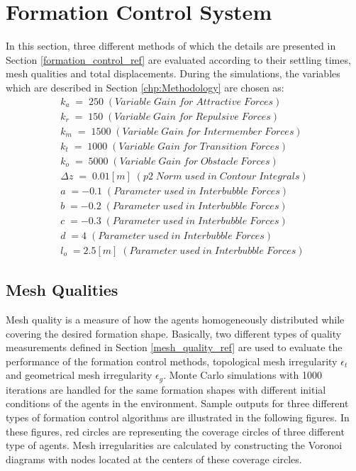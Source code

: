 		
\section{Formation Control System}
In this section, three different methods of which the details are presented in Section \ref{formation_control_ref} are evaluated according to their settling times, mesh qualities and total displacements. During the simulations, the variables which are described in Section \ref{chp:Methodology} are chosen as:
\begin{align*}
  k_a\;=\;250\;(Variable\;Gain\;for\;Attractive\;Forces)\\
  k_r\;=\;150\;(Variable\;Gain\;for\;Repulsive\;Forces)\\
  k_m\;=\;1500\;(Variable\;Gain\;for\;Intermember\;Forces)\\
  k_t\;=\;1000\;(Variable\;Gain\;for\;Transition\;Forces)\\
  k_o\;=\;5000\;(Variable\;Gain\;for\;Obstacle\;Forces)\\
  \Delta z\;=\;0.01[m]\;(p2\;Norm\;used\;in\;Contour\;Integrals)\\
  a\;=-0.1\;(Parameter\;used\;in\;Interbubble\;Forces)\\
  b\;=-0.2\;(Parameter\;used\;in\;Interbubble\;Forces)\\ 
  c\;=-0.3\;(Parameter\;used\;in\;Interbubble\;Forces)\\ 
  d\;=4\;(Parameter\;used\;in\;Interbubble\;Forces)\\
  l_o\;=2.5[m]\;(Parameter\;used\;in\;Interbubble\;Forces)     
\end{align*}

\subsection{Mesh Qualities} 
Mesh quality is a measure of how the agents homogeneously distributed while covering the desired formation shape. Basically, two different types of quality measurements defined in Section \ref{mesh_quality_ref} are used to evaluate the performance of the formation control methods, topological mesh irregularity $\epsilon_t$ and geometrical mesh irregularity $\epsilon_g$. Monte Carlo simulations with 1000 iterations are handled for the same formation shapes with different initial conditions of the agents in the environment. Sample outputs for three different types of formation control algorithms are illustrated in the following figures. In these figures, red circles are representing the coverage circles of three different type of agents. Mesh irregularities are calculated by constructing the Voronoi diagrams with nodes located at the centers of these coverage circles.
  
